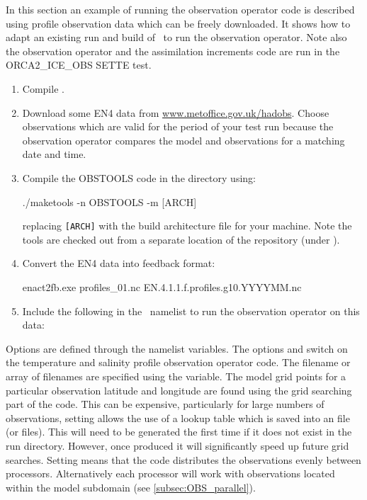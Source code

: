 \documentclass[../main/NEMO_manual]{subfiles}
\begin{document}
In this section an example of running the observation operator code is described using
profile observation data which can be freely downloaded.
It shows how to adapt an existing run and build of \NEMO\ to run the observation operator. Note also the observation operator and the assimilation increments code are run in the ORCA2\_ICE\_OBS SETTE test.

\begin{enumerate}
\item Compile \NEMO.

\item Download some EN4 data from \href{http://www.metoffice.gov.uk/hadobs}{www.metoffice.gov.uk/hadobs}.
  Choose observations which are valid for the period of your test run because
  the observation operator compares the model and observations for a matching date and time.

\item Compile the OBSTOOLS code in the  directory using:
\begin{cmds}
./maketools -n OBSTOOLS -m [ARCH]
\end{cmds}

replacing \texttt{[ARCH]} with the build architecture file for your machine. Note the tools are checked out from a separate location of the repository (under ).

\item Convert the EN4 data into feedback format:
\begin{cmds}
enact2fb.exe profiles_01.nc EN.4.1.1.f.profiles.g10.YYYYMM.nc
\end{cmds}

\item Include the following in the \NEMO\ namelist to run the observation operator on this data:
\end{enumerate}

Options are defined through the  namelist variables.
The options  and  switch on the temperature and salinity profile observation operator code.
The filename or array of filenames are specified using the  variable.
The model grid points for a particular observation latitude and longitude are found using
the grid searching part of the code.
This can be expensive, particularly for large numbers of observations,
setting  allows the use of a lookup table which
is saved into an  file (or files).
This will need to be generated the first time if it does not exist in the run directory.
However, once produced it will significantly speed up future grid searches.
Setting  means that the code distributes the observations evenly between processors.
Alternatively each processor will work with observations located within the model subdomain
(see \autoref{subsec:OBS_parallel}).
\end{document}
